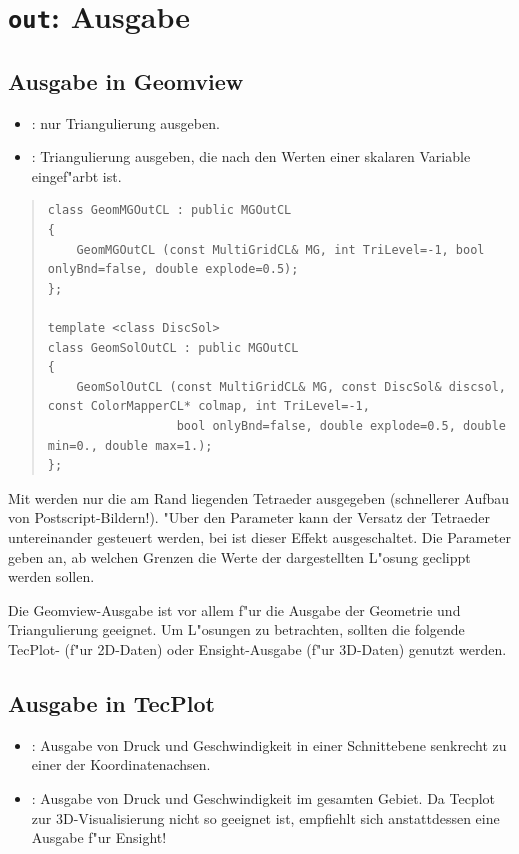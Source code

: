 \documentclass[11pt,a4paper]{article}
\newenvironment{Code}{\begin{quote}\scriptsize}{\end{quote}}
\begin{document}
\section{{\tt out}: Ausgabe}

\subsection{Ausgabe in Geomview}
\begin{itemize}
    \item {}: nur Triangulierung ausgeben.
    \item {}: Triangulierung ausgeben, die nach den Werten 
    einer skalaren Variable eingef"arbt ist.
\end{itemize}

\begin{Code}
\begin{verbatim}
class GeomMGOutCL : public MGOutCL
{
    GeomMGOutCL (const MultiGridCL& MG, int TriLevel=-1, bool onlyBnd=false, double explode=0.5);
};

template <class DiscSol>
class GeomSolOutCL : public MGOutCL
{
    GeomSolOutCL (const MultiGridCL& MG, const DiscSol& discsol, const ColorMapperCL* colmap, int TriLevel=-1, 
                  bool onlyBnd=false, double explode=0.5, double min=0., double max=1.);
};
\end{verbatim}
\end{Code}

Mit  werden nur die am Rand liegenden Tetraeder ausgegeben
(schnellerer Aufbau von Postscript-Bildern!). "Uber den Parameter 
kann der Versatz der Tetraeder untereinander gesteuert werden, bei
 ist dieser Effekt ausgeschaltet. Die Parameter 
geben an, ab welchen Grenzen die Werte der dargestellten L"osung geclippt
werden sollen.

Die Geomview-Ausgabe ist vor allem f"ur die Ausgabe der Geometrie und
Triangulierung geeignet. Um L"osungen zu betrachten, sollten die folgende
TecPlot- (f"ur 2D-Daten) oder Ensight-Ausgabe (f"ur 3D-Daten) genutzt werden.

\subsection{Ausgabe in TecPlot}
\begin{itemize}
    \item {}: Ausgabe von Druck und Geschwindigkeit 
    in einer Schnittebene senkrecht zu einer der Koordinatenachsen.
    \item {}: Ausgabe von Druck und Geschwindigkeit im gesamten
    Gebiet. Da Tecplot zur 3D-Visualisierung nicht so geeignet ist, empfiehlt
    sich anstattdessen eine Ausgabe f"ur Ensight!
\end{itemize}
\end{document}
